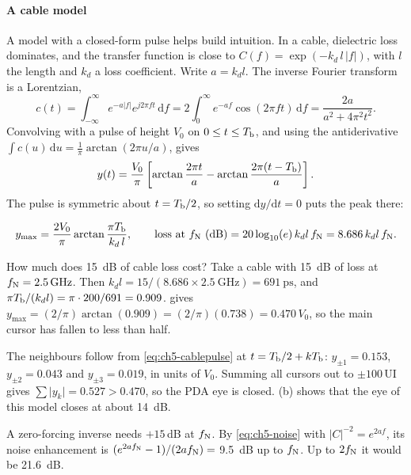 \paragraph{A cable model} A model with a closed-form pulse helps build intuition. In a cable, dielectric loss dominates, and the transfer function is close to $C(f)=\exp(-k_d\,l\,\lvert f\rvert)$, with $l$ the length and $k_d$ a loss coefficient. Write $a=k_dl$. The inverse Fourier transform is a Lorentzian,
\begin{equation}
  c(t)=\int_{-\infty}^{\infty}e^{-a\lvert f\rvert}e^{j2\pi ft}\,\mathrm{d}f=2\int_0^\infty e^{-af}\cos(2\pi ft)\,\mathrm{d}f=\frac{2a}{a^2+4\pi^2t^2}.
  \label{eq:ch5-lorentz}
\end{equation}
Convolving with a pulse of height $V_0$ on $0\le t\le T_\mathrm{b}$, and using the antiderivative $\int c(u)\,\mathrm{d}u=\tfrac1\pi\arctan(2\pi u/a)$, gives
\begin{equation}
  y(t)=\frac{V_0}{\pi}\left[\arctan\frac{2\pi t}{a}-\arctan\frac{2\pi(t-T_\mathrm{b})}{a}\right].
  \label{eq:ch5-cablepulse}
\end{equation}
The pulse is symmetric about $t=T_\mathrm{b}/2$, so setting $\mathrm{d}y/\mathrm{d}t=0$ puts the peak there:

\begin{keyeq}
\begin{equation}
  y_{\max}=\frac{2V_0}{\pi}\arctan\frac{\pi\Tb}{k_d\,l},\qquad
  \text{loss at }\fN\ (\mathrm{dB})=20\log_{10}(e)\,k_dl\,\fN=8.686\,k_dl\,\fN .
  \label{eq:ch5-ymax}
\end{equation}
\end{keyeq}

\begin{example}{How much does \qty{15}{\deci\bel} of cable loss cost?}\label{we:ch5-cable}
Take a cable with \qty{15}{\deci\bel} of loss at $f_\mathrm{N}=\qty{2.5}{\giga\hertz}$. Then $k_dl=15/(8.686\times\qty{2.5}{\giga\hertz})=\qty{691}{\pico\second}$, and $\pi T_\mathrm{b}/(k_dl)=\pi\cdot200/691=0.909$.  gives $y_{\max}=(2/\pi)\arctan(0.909)=(2/\pi)(0.738)=0.470\,V_0$, so the main cursor has fallen to less than half.

The neighbours follow from \cref{eq:ch5-cablepulse} at $t=T_\mathrm{b}/2+kT_\mathrm{b}$: $y_{\pm1}=0.153$, $y_{\pm2}=0.043$ and $y_{\pm3}=0.019$, in units of $V_0$. Summing all cursors out to $\pm100$\,UI gives $\sum\lvert y_k\rvert=0.527>0.470$, so the PDA eye is closed. (b) shows that the eye of this model closes at about \qty{14}{\deci\bel}.

A zero-forcing inverse needs $+15$\,dB at $f_\mathrm{N}$. By \cref{eq:ch5-noise} with $\lvert C\rvert^{-2}=e^{2af}$, its noise enhancement is $(e^{2af_\mathrm{N}}-1)/(2af_\mathrm{N})=$ \qty{9.5}{\deci\bel} up to $f_\mathrm{N}$. Up to $2f_\mathrm{N}$ it would be \qty{21.6}{\deci\bel}.
\end{example}

